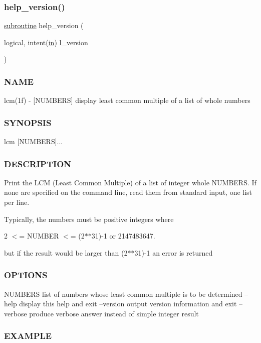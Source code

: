\subsubsection{\texorpdfstring{help\+\_\+version()}{help\_version()}}
{\footnotesize\ttfamily \hyperlink{M__stopwatch_83_8txt_acfbcff50169d691ff02d4a123ed70482}{subroutine} help\+\_\+version (\begin{DoxyParamCaption}\item[{logical, intent(\hyperlink{M__journal_83_8txt_afce72651d1eed785a2132bee863b2f38}{in})}]{l\+\_\+version }\end{DoxyParamCaption})}



\subsubsection*{N\+A\+ME}

lcm(1f) -\/ \mbox{[}N\+U\+M\+B\+E\+RS\mbox{]} display least common multiple of a list of whole numbers 

\subsubsection*{S\+Y\+N\+O\+P\+S\+IS}

\begin{DoxyVerb}    lcm [NUMBERS]...
\end{DoxyVerb}


\subsubsection*{D\+E\+S\+C\+R\+I\+P\+T\+I\+ON}

Print the L\+CM (Least Common Multiple) of a list of integer whole N\+U\+M\+B\+E\+RS. If none are specified on the command line, read them from standard input, one list per line.

Typically, the numbers must be positive integers where

2 $<$= N\+U\+M\+B\+ER $<$= (2$\ast$$\ast$31)-\/1 or 2147483647.

but if the result would be larger than (2$\ast$$\ast$31)-\/1 an error is returned

\subsubsection*{O\+P\+T\+I\+O\+NS}

N\+U\+M\+B\+E\+RS list of numbers whose least common multiple is to be determined --help display this help and exit --version output version information and exit --verbose produce verbose answer instead of simple integer result \subsubsection*{E\+X\+A\+M\+P\+LE}

